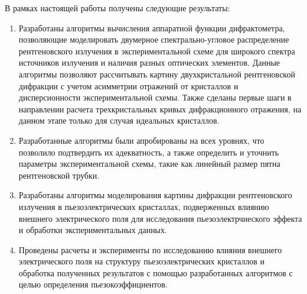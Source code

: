   В рамках настоящей работы получены следующие результаты:
\begin{enumerate}
\item Разработаны алгоритмы вычисления аппаратной функции дифрактометра, позволяющие моделировать
двумерное спектрально-угловое распределение рентгеновского излучения в экспериментальной схеме
для широкого спектра источников излучения и наличия разных оптических элементов.
Данные алгоритмы позволяют рассчитывать картину двухкристальной рентгеновской дифракции с учетом
асимметрии отражений от кристаллов и дисперсионности экспериментальной схемы.
 Также сделаны первые шаги в направлении расчета трехкристальных кривых дифракционного
отражения, на данном этапе только для случая идеальных кристаллов.

\item Разработанные алгоритмы были апробированы на всех уровнях, что позволило подтвердить их адекватность,
а также определить и уточнить параметры экспериментальной схемы, такие как линейный размер пятна
рентгеновской трубки.

\item  Разработаны алгоритмы моделирования картины дифракции рентгеновского излучения в
пьезоэлектрических кристаллах, подверженных
влиянию внешнего электрического поля для исследования пьезоэлектрчиеского эффекта и обработки
экспериментальных данных.

\item Проведены расчеты и эксперименты по исследованию влияния внешнего электрического поля на структуру
пьезоэлектрических кристаллов и обработка полученных результатов с помощью разработанных алгоритмов
с целью определения пьезокоэффициентов.
\end{enumerate}
